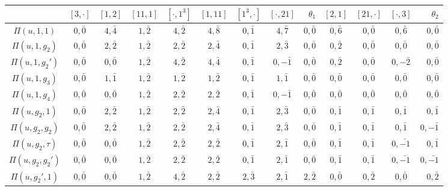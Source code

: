 \begin{landscape}
    \begin{table}[!ht]
        \centering
        {\small
        \begin{tabular}{|c|cccc|cccR|cccR|}
            \hline
        & $[3,\cdot]$ & $[1,2]$ & $[11,1]$ & $[\cdot,1^3]$ & $[1,11]$ & $[1^3,\cdot]$ & $[\cdot,21]$ & $\theta_1$ & $[2,1]$ & $[21,\cdot]$ & $[\cdot,3]$ & $\theta_2$ \\\hline
        $\Pi(u,1,1)$ & $0,\bar0$ & $4,\bar{4}$ & $1,\bar2$ & $4,\bar2$ & $4,\bar{8}$ & $0,\bar1$ & $4,\bar{7}$ & $0,\bar0$ & $0,\bar{6}$ & $0,\bar0$ & $0,\bar{6}$ & $0,\bar0$\\
        $\Pi(u,1,g_2)$ & $0,\bar0$ & $2,\bar2$ & $1,\bar2$ & $2,\bar2$ & $2,\bar{4}$ & $0,\bar1$ & $2,\bar{3}$ & $0,\bar0$ & $0,\bar2$ & $0,\bar0$ & $0,\bar0$ & $0,\bar0$ \\
        $\Pi(u,1,g_2')$ & $0,\bar0$ & $0,\bar0$ & $1,\bar2$ & $4,\bar2$ & $4,\bar{4}$ & $0,\bar1$ & $0,-\bar1$ & $0,\bar0$ & $0,\bar2$ & $0,\bar0$ & $0,-\bar2$ & $0,\bar0$ \\
        $\Pi(u,1,g_3)$ & $0,\bar0$ & $1,\bar1$ & $1,\bar2$ & $1,\bar2$ & $1,\bar2$ & $0,\bar1$ & $1,\bar1$ & $0,\bar0$ & $0,\bar0$ & $0,\bar0$ & $0,\bar0$ & $0,\bar0$ \\
        $\Pi(u,1,g_4)$ & $0,\bar0$ & $0,\bar0$ & $1,\bar2$ & $2,\bar2$ & $2,\bar2$ & $0,\bar1$ & $0,-\bar1$ & $0,\bar0$ & $0,\bar0$ & $0,\bar0$ & $0,\bar0$ & $0,\bar0$ \\\hline
        $\Pi(u,g_2,1)$ & $0,\bar0$ & $2,\bar2$ & $1,\bar2$ & $2,\bar2$ & $2,\bar{4}$ & $0,\bar1$ & $2,\bar{3}$ & $0,\bar0$ & $0,\bar1$ & $0,\bar1$ & $0,\bar1$ & $0,\bar1$ \\
        $\Pi(u,g_2,g_2)$ & $0,\bar0$ & $2,\bar2$ & $1,\bar2$ & $2,\bar2$ & $2,\bar{4}$ & $0,\bar1$ & $2,\bar{3}$ & $0,\bar0$ & $0,\bar1$ & $0,\bar1$ & $0,\bar1$ & $0,-\bar1$ \\
        $\Pi(u,g_2,\tau)$ & $0,\bar0$ & $0,\bar0$ & $1,\bar2$ & $2,\bar2$ & $2,\bar2$ & $0,\bar1$ & $2,\bar1$ & $0,\bar0$ & $0,\bar1$ & $0,\bar1$ & $0,\bar{-1}$ & $0,\bar1$ \\
        $\Pi(u,g_2,g_2')$ & $0,\bar0$ & $0,\bar0$ & $1,\bar2$ & $2,\bar2$ & $2,\bar2$ & $0,\bar1$ & $2,\bar1$ & $0,\bar0$ & $0,\bar1$ & $0,\bar1$ & $0,\bar{-1}$ & $0,\bar{-1}$ \\\hline

        $\Pi(u,g_2',1)$ & $0,\bar0$ & $0,\bar0$ & $1,\bar2$ & $4,\bar2$ & $2,\bar2$ & $2,\bar{3}$ & $2,\bar1$ & $2,\bar2$ & $0,\bar0$ & $0,\bar2$ & $0,\bar0$ & $0,\bar2$\\


\end{tabular}}
\end{table}
\end{landscape}
